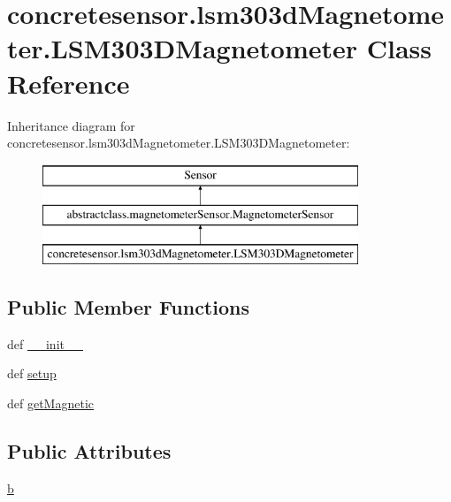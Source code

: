 \hypertarget{classconcretesensor_1_1lsm303dMagnetometer_1_1LSM303DMagnetometer}{}\section{concretesensor.\+lsm303d\+Magnetometer.\+L\+S\+M303\+D\+Magnetometer Class Reference}
\label{classconcretesensor_1_1lsm303dMagnetometer_1_1LSM303DMagnetometer}
Inheritance diagram for concretesensor.\+lsm303d\+Magnetometer.\+L\+S\+M303\+D\+Magnetometer\+:\begin{figure}[H]
\begin{center}
\leavevmode
\includegraphics[height=3.000000cm]{classconcretesensor_1_1lsm303dMagnetometer_1_1LSM303DMagnetometer}
\end{center}
\end{figure}
\subsection*{Public Member Functions}
\begin{DoxyCompactItemize}
\item 
def \hyperlink{classconcretesensor_1_1lsm303dMagnetometer_1_1LSM303DMagnetometer_acc97af1e9c768b084f1de2b5f92e04fd}{\+\_\+\+\_\+init\+\_\+\+\_\+}
\item 
def \hyperlink{classconcretesensor_1_1lsm303dMagnetometer_1_1LSM303DMagnetometer_ac2cb258ac5f3b7ad4108b07e7eb93141}{setup}
\item 
def \hyperlink{classconcretesensor_1_1lsm303dMagnetometer_1_1LSM303DMagnetometer_ae017a26e96b9ee93ec76af957a95ac0d}{get\+Magnetic}
\end{DoxyCompactItemize}
\subsection*{Public Attributes}
\begin{DoxyCompactItemize}
\item 
\hyperlink{classconcretesensor_1_1lsm303dMagnetometer_1_1LSM303DMagnetometer_a1c50fee63e0e630693d262ae9786e557}{b}
\end{DoxyCompactItemize}
